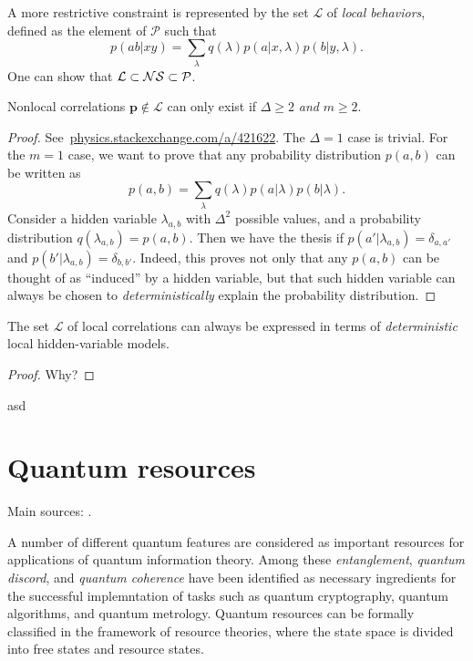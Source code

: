 \documentclass[12pt]{report}
\begin{document}
A more restrictive constraint is represented by the set $\mathcal L$ of \emph{local behaviors}, defined as the element of $\mathcal P$ such that
\begin{equation}
    p(ab|xy)=\sum_\lambda q(\lambda) p(a|x,\lambda)p(b|y,\lambda).
\end{equation}
One can show that $\mathcal L\subset \mathcal{N}\mathcal{S}\subset \mathcal P$.
\begin{prop}
    Nonlocal correlations $\mathbf p\notin \mathcal L$ can only exist if $\Delta\ge2$ \emph{and} $m\ge2$.
\end{prop}
\begin{proof}
    See~\href{https://physics.stackexchange.com/a/421622/58382}{physics.stackexchange.com/a/421622}.
    The $\Delta=1$ case is trivial. For the $m=1$ case, we want to prove that any probability distribution $p(a,b)$ can be written as
    \begin{equation}
        p(a,b)=\sum_\lambda q(\lambda)p(a|\lambda)p(b|\lambda).
    \end{equation}
    Consider a hidden variable $\lambda_{a,b}$ with $\Delta^2$ possible values, and a probability distribution $q(\lambda_{a,b})=p(a,b)$.
    Then we have the thesis if $p(a'|\lambda_{a,b})=\delta_{a,a'}$ and $p(b'|\lambda_{a,b})=\delta_{b,b'}$.
    Indeed, this proves not only that any $p(a,b)$ can be thought of as ``induced'' by a hidden variable, but that such hidden variable can always be chosen to \emph{deterministically} explain the probability distribution.
\end{proof}

\begin{prop}
    The set $\mathcal L$ of local correlations can always be expressed in terms of \emph{deterministic} local hidden-variable models.
\end{prop}
\begin{proof}
    \large{\color{red}Why?}
\end{proof}

\begin{prop}
    asd
\end{prop}


\chapter{Quantum resources}

Main sources: \cite{streltsov2016maximal}.

A number of different quantum features are considered as important resources for applications of quantum information theory.
Among these \emph{entanglement}, \emph{quantum discord}, and \emph{quantum coherence} have been identified as necessary ingredients for the successful implemntation of tasks such as quantum cryptography, quantum algorithms, and quantum metrology.
Quantum resources can be formally classified in the framework of resource theories,
where the state space is divided into free states and resource states.
\end{document}
